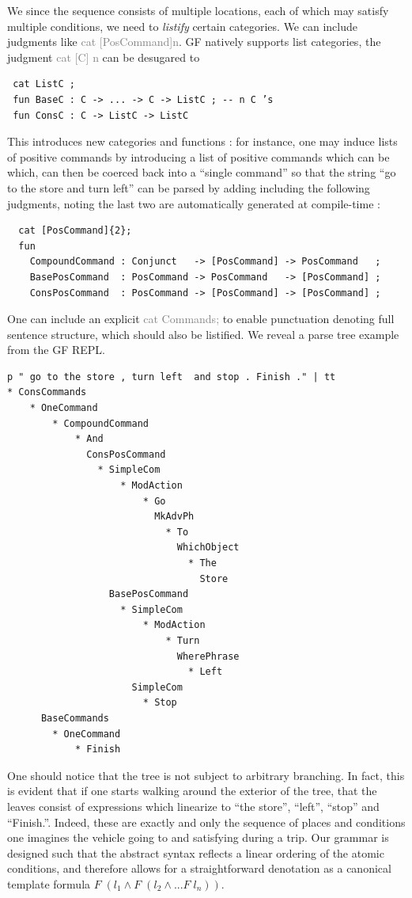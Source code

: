 \documentclass{article}
\newcommand{\gray}[1]{\textcolor{gray}{#1}}
\begin{document}
We since the sequence consists of multiple locations, each of which may satisfy multiple
conditions, we need to \emph{listify} certain categories. We can include
judgments like \gray{cat [PosCommand]{n}}.
GF natively supports list categories, the judgment \gray{cat [C] {n}} can be
desugared to

\begin{verbatim}
 cat ListC ;
 fun BaseC : C -> ... -> C -> ListC ; -- n C ’s
 fun ConsC : C -> ListC -> ListC
\end{verbatim}

This introduces new categories and functions : for instance, one may induce
lists of positive commands by introducing a list of positive commands which can
be which, can then be coerced back into a ``single command'' so that the string
``go to the store and turn left'' can be parsed by adding including the
following judgments, noting the last two are automatically generated at compile-time :

\begin{verbatim}
  cat [PosCommand]{2};
  fun
    CompoundCommand : Conjunct   -> [PosCommand] -> PosCommand   ;
    BasePosCommand  : PosCommand -> PosCommand   -> [PosCommand] ;
    ConsPosCommand  : PosCommand -> [PosCommand] -> [PosCommand] ;
\end{verbatim}

One can include an explicit \gray{cat Commands;} to enable punctuation denoting
full sentence structure, which should also be listified. We reveal a parse tree
example from the GF REPL.

\begin{verbatim}
p " go to the store , turn left  and stop . Finish ." | tt
* ConsCommands
    * OneCommand
        * CompoundCommand
            * And
              ConsPosCommand
                * SimpleCom
                    * ModAction
                        * Go
                          MkAdvPh
                            * To
                              WhichObject
                                * The
                                  Store
                  BasePosCommand
                    * SimpleCom
                        * ModAction
                            * Turn
                              WherePhrase
                                * Left
                      SimpleCom
                        * Stop
      BaseCommands
        * OneCommand
            * Finish
\end{verbatim}

One should notice that the tree is not subject to arbitrary branching. In fact,
this is evident that if one starts walking around the exterior of the tree, that
the leaves consist of expressions which linearize to ``the store'', ``left'',
``stop'' and ``Finish.''. Indeed, these are exactly and only the sequence of
places and conditions one imagines the vehicle going to and satisfying during
a trip. Our grammar is designed such that the abstract syntax reflects a linear
ordering of the atomic conditions, and therefore allows for a straightforward
denotation as a canonical template formula $F\; (l_1 \wedge F\; (l_{2} \wedge ... F\; l_{n}))$.
\end{document}

